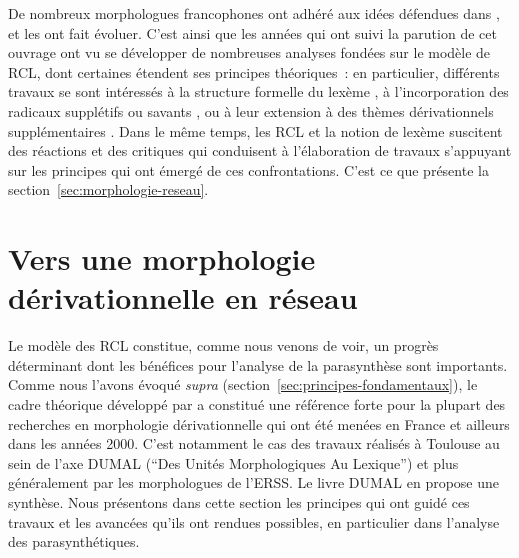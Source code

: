 \documentclass[output=paper]{langsci/langscibook}
\begin{document}
De nombreux morphologues francophones ont adhéré aux idées défendues dans \citet{Fradin03}, et les ont fait évoluer. C'est ainsi que les années qui ont suivi la parution de cet ouvrage ont vu se développer de nombreuses analyses fondées sur le modèle de RCL, dont certaines étendent ses principes théoriques~: en particulier, différents travaux se sont intéressés à la structure formelle du lexème \citep{bonami2007.bases-conjugaison}, à l'incorporation des radicaux supplétifs ou savants \citep{amiot2005.IMM5,Bonami2009a}, ou à leur extension à des thèmes dérivationnels supplémentaires \citep{tribout2012:word-structure}. Dans le même temps, les RCL et la notion de lexème suscitent des réactions et des critiques qui conduisent à l'élaboration de travaux s'appuyant sur les principes qui ont émergé de ces confrontations. C'est ce que présente la section~\ref{sec:morphologie-reseau}.






\section{Vers une morphologie dérivationnelle en réseau}
\label{sec:morphologie-reseau}

Le modèle des RCL constitue, comme nous venons de voir, un progrès déterminant dont les bénéfices pour l'analyse de la parasynthèse sont importants.  Comme nous l'avons évoqué \emph{supra} (section~\ref{sec:principes-fondamentaux}), le cadre théorique développé par \cite{Fradin03} a constitué une référence forte pour la plupart des recherches en morphologie dérivationnelle qui ont été menées en France et ailleurs dans les années 2000.  C'est notamment le cas des travaux réalisés à Toulouse au sein de l'axe DUMAL (``Des Unités Morphologiques Au Lexique'') et plus généralement par les morphologues de l'ERSS.  Le livre DUMAL \citep{roche2011.dumal} en propose une synthèse.  Nous présentons dans cette section les principes qui ont guidé ces travaux et les avancées qu'ils ont rendues possibles, en particulier dans l'analyse des parasynthétiques.
\end{document}
